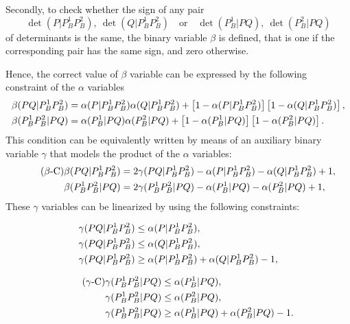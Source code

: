 \documentclass[a4paper,  review, authoryear, 1p.]{elsarticle}
\newcommand{\determinant}[3]{\det({#1|#2#3})}
\begin{document}
Secondly, to check whether the sign of any pair
\begin{equation}\label{eq:pair}
	\determinant{P}{P_B^1}{P_B^2},\: \determinant{Q}{P_B^1}{P_B^2}\quad \text{or} \quad \determinant{P_B^1}{P}{Q},\:	 \determinant{P_B^2}{P}{Q}
\end{equation} 
of determinants is the same, the binary variable $\beta$ is defined, that is one if the corresponding pair has the same sign, and zero otherwise.

\newcommand{\gammaprod}[4]{\gamma(#1#2|#3#4)}

Hence, the correct value of $\beta$ variable can be expressed by the following constraint of the $\alpha$ variables
\begin{align*}%
	\betamas{P}{Q}{P_B^1}{P_B^2}&=\alphamas{P}{P_B^1}{P_B^2}\alphamas{Q}{P_B^1}{P_B^2} + \left[1-\alphamas{P}{P_B^1}{P_B^2}\right]\left[1-\alphamas{Q}{P_B^1}{P_B^2}\right],\\
	\betamas{P_B^1}{P_B^2}{P}{Q}&=\alphamas{P_B^1}{P}{Q}\alphamas{P_B^2}{P}{Q} + \left[1-\alphamas{P_B^1}{P}{Q}\right]\left[1-\alphamas{P_B^2}{P}{Q}\right].
\end{align*}
This condition can be equivalently written by means of an auxiliary binary variable $\gamma$ that models the product of the $\alpha$ variables:
\begin{align*}\tag{$\beta$-C}\label{eq:betaC}
	\betamas{P}{Q}{P_B^1}{P_B^2}&=2\gammaprod{P}{Q}{P_B^1}{P_B^2} -\alphamas{P}{P_B^1}{P_B^2}-\alphamas{Q}{P_B^1}{P_B^2}+1,\\
	\betamas{P_B^1}{P_B^2}{P}{Q}&=2\gammaprod{P_B^1}{P_B^2}{P}{Q} -\alphamas{P_B^1}{P}{Q}-\alphamas{P_B^2}{P}{Q}+1,
\end{align*}
These $\gamma$ variables can be linearized by using the following constraints:

\begin{minipage}{.5\linewidth}
	\begin{align*}
		\gammaprod{P}{Q}{P_B^1}{P_B^2} & \leq \alphamas{P}{P_B^1}{P_B^2},\\
		\gammaprod{P}{Q}{P_B^1}{P_B^2} & \leq \alphamas{Q}{P_B^1}{P_B^2},\\
		\gammaprod{P}{Q}{P_B^1}{P_B^2} & \geq \alphamas{P}{P_B^1}{P_B^2} + \alphamas{Q}{P_B^1}{P_B^2} - 1,
	\end{align*}
\end{minipage}
\begin{minipage}{.5\linewidth}
	\begin{align*}\tag{$\gamma$-C}\label{eq:gammaC}
		\gammaprod{P_B^1}{P_B^2}{P}{Q} & \leq \alphamas{P_B^1}{P}{Q},\\
		\gammaprod{P_B^1}{P_B^2}{P}{Q} & \leq \alphamas{P_B^2}{P}{Q},\\
		\gammaprod{P_B^1}{P_B^2}{P}{Q} & \geq \alphamas{P_B^1}{P}{Q} + \alphamas{P_B^2}{P}{Q} - 1.
	\end{align*}
\end{minipage}
\end{document}

